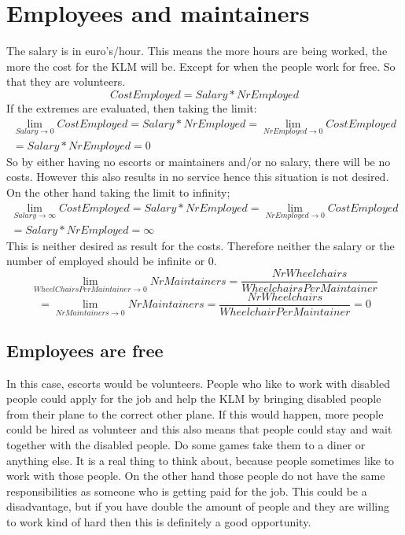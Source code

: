 \documentclass[a4paper, 11pt, notitlepage]{report}
\begin{document}
\section{Employees and maintainers}
The salary is in euro's/hour. This means the more hours are being worked, the more the cost for the KLM will be. Except for when the people work for free. So that they are volunteers.\\
\begin{equation}
CostEmployed = Salary * NrEmployed
\end{equation}
If the extremes are evaluated, then taking the limit:
\begin{multline}
\lim_{Salary \rightarrow 0}CostEmployed = Salary * NrEmployed = \lim_{NrEmployed \rightarrow 0}CostEmployed \\ = Salary * NrEmployed = 0
\end{multline}
So by either having no escorts or maintainers and/or no salary, there will be no costs. However this also results in no service hence this situation is not desired. On the other hand taking the limit to infinity;
\begin{multline}
\lim_{Salary \rightarrow \infty} CostEmployed = Salary * NrEmployed = \lim_{NrEmployed \rightarrow 0} CostEmployed \\ = Salary * NrEmployed = \infty
\end{multline}
This is neither desired as result for the costs. Therefore neither the salary or the number of employed should be infinite or 0.
\begin{equation}
\lim_{WheelChairsPerMaintainer \rightarrow 0} NrMaintainers = \frac{NrWheelchairs}{WheelchairsPerMaintainer}
\end{equation}
\begin{equation}
= \lim_{NrMaintainers \rightarrow 0}NrMaintainers = \frac{NrWheelchairs}{WheelchairPerMaintainer} = 0
\end{equation}


\subsection{Employees are free}
In this case, escorts would be volunteers. People who like to work with disabled people could apply for the job and help the KLM by bringing disabled people from their plane to the correct other plane. If this would happen, more people could be hired as volunteer and this also means that people could stay and wait together with the disabled people. Do some games take them to a diner or anything else. It is a real thing to think about, because people sometimes like to work with those people. On the other hand those people do not have the same responsibilities as someone who is getting paid for the job. This could be a disadvantage, but if you have double the amount of people and they are willing to work kind of hard then this is definitely a good opportunity.
\end{document}
